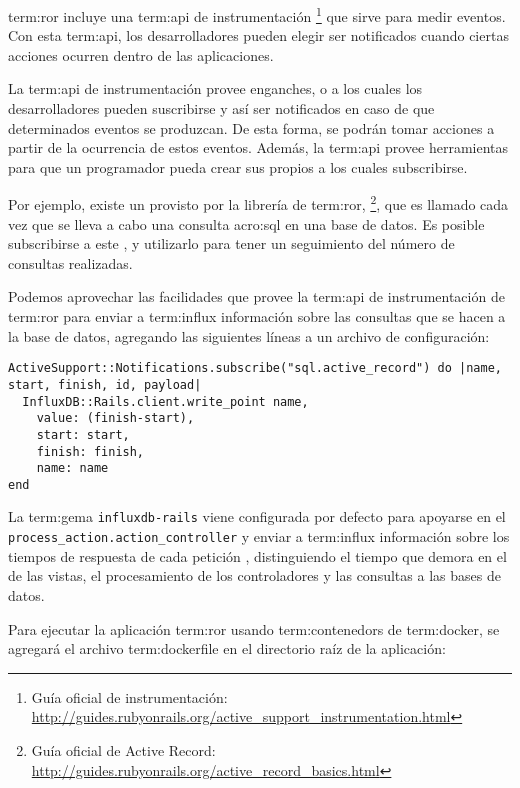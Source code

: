 \gls{term:ror} incluye una \gls{term:api} de instrumentación
\footnote{Guía oficial de instrumentación:
\url{http://guides.rubyonrails.org/active_support_instrumentation.html}}
que sirve para medir eventos. Con esta \gls{term:api}, los desarrolladores
pueden elegir ser notificados cuando ciertas acciones ocurren dentro de las
aplicaciones.

La \gls{term:api} de instrumentación provee enganches, o  a los
cuales los desarrolladores pueden suscribirse y así ser notificados en caso de
que determinados eventos se produzcan. De esta forma, se podrán tomar acciones
a partir de la ocurrencia de estos eventos. Además, la \gls{term:api} provee
herramientas para que un programador pueda crear sus propios  a los
cuales subscribirse.

Por ejemplo, existe un  provisto por la librería de \gls{term:ror},
\footnote{Guía oficial de Active Record:
\url{http://guides.rubyonrails.org/active_record_basics.html}}, que es
llamado cada vez que se lleva a cabo una consulta \gls{acro:sql} en una base de datos. Es
posible subscribirse a este , y utilizarlo para tener un seguimiento
del número de consultas realizadas.

Podemos aprovechar las facilidades que provee la \gls{term:api} de
instrumentación de \gls{term:ror} para enviar a \gls{term:influx} información
sobre las consultas que se hacen a la base de datos, agregando las siguientes
líneas a un archivo de configuración:

\begin{lstlisting}
ActiveSupport::Notifications.subscribe("sql.active_record") do |name, start, finish, id, payload|
  InfluxDB::Rails.client.write_point name,
    value: (finish-start),
    start: start,
    finish: finish,
    name: name
end
\end{lstlisting}

La \gls{term:gema} \texttt{influxdb-rails} viene configurada por defecto para
apoyarse en el  \lstinline{process_action.action_controller} y
enviar a \gls{term:influx} información sobre los tiempos de respuesta de cada
petición , distinguiendo el tiempo que demora en el 
de las vistas, el procesamiento de los controladores y las consultas a las bases
de datos.

Para ejecutar la aplicación \gls{term:ror} usando \glspl{term:contenedor} de
\gls{term:docker}, se agregará el archivo \gls{term:dockerfile} en el directorio
raíz de la aplicación:

